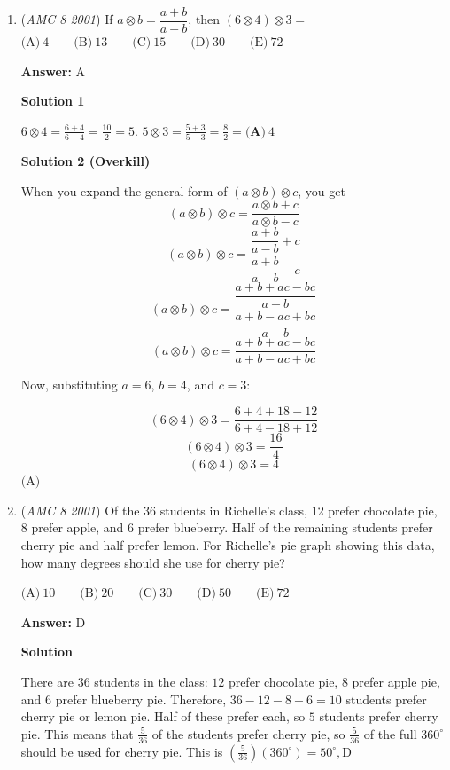 \begin{enumerate}
\textbf{Solution 4(Can someone make an asymptote for this)}

We can add a 2 by 6 triangle to make a 4*6 rectangle which has area 24. Then subtracting the area of the triangle, we get 24-(2*6/2)=24-6=18, answer C

 


 


	\item (\textit{AMC 8 2001}) If $a\otimes b = \dfrac{a + b}{a - b}$, then $(6\otimes 4)\otimes 3 =$
$\text{(A)}\ 4 \qquad \text{(B)}\ 13 \qquad \text{(C)}\ 15 \qquad \text{(D)}\ 30 \qquad \text{(E)}\ 72$

 \textbf{Answer: }A



\textbf{Solution 1}

$6\otimes4=\frac{6+4}{6-4}=\frac{10}{2}=5$. $5\otimes3=\frac{5+3}{5-3}=\frac{8}{2}=\boxed{\textbf{(A)}\ 4}$




\textbf{Solution 2 (Overkill)}

When you expand the general form of $(a\otimes b)\otimes c$, you get 
 \[(a\otimes b)\otimes c = \dfrac{a\otimes b + c}{a\otimes b - c}\]
 \[(a\otimes b)\otimes c = \dfrac{\dfrac{a + b}{a - b} + c}{\dfrac{a + b}{a - b} - c}\]
 \[(a\otimes b)\otimes c = \dfrac{\dfrac{a + b + ac - bc}{a - b}}{\dfrac{a + b - ac + bc}{a - b}}\]
 \[(a\otimes b)\otimes c = \dfrac{a + b + ac -bc}{a + b - ac + bc}\]

 Now, substituting $a=6$, $b=4$, and $c=3$:

 
 \[(6\otimes 4)\otimes 3 = \dfrac{6 + 4 + 18 - 12}{6 + 4 - 18 + 12}\]
 \[(6\otimes 4)\otimes 3 = \dfrac{16}{4}\]
 \[(6\otimes 4)\otimes 3 = 4\]$\boxed{\text {(A)}}$



	\item (\textit{AMC 8 2001}) Of the 36 students in Richelle's class, 12 prefer chocolate pie, 8 prefer apple, and 6 prefer blueberry. Half of the remaining students prefer cherry pie and half prefer lemon. For Richelle's pie graph showing this data, how many degrees should she use for cherry pie?


 $\text{(A)}\ 10 \qquad \text{(B)}\ 20 \qquad \text{(C)}\ 30 \qquad \text{(D)}\ 50 \qquad \text{(E)}\ 72$

 \textbf{Answer: }D



\textbf{Solution}

There are $36$ students in the class: $12$ prefer chocolate pie, $8$ prefer apple pie, and $6$ prefer blueberry pie. Therefore, $36-12-8-6=10$ students prefer cherry pie or lemon pie. Half of these prefer each, so $5$ students prefer cherry pie. This means that $\frac{5}{36}$ of the students prefer cherry pie, so $\frac{5}{36}$ of the full $360^\circ$ should be used for cherry pie. This is $(\frac{5}{36})(360^\circ)=50^\circ, \boxed{\text{D}}$




\end{enumerate}
